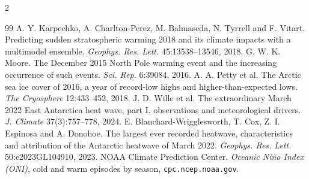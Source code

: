 \documentclass[10pt,twocolumn]{article}
\begin{document}
\begin{multicols}{2}
\begin{thebibliography}{99}
 A. Y. Karpechko, A. Charlton-Perez, M. Balmaseda, N. Tyrrell and F. Vitart. Predicting sudden stratospheric warming 2018 and its climate impacts with a multimodel ensemble. \emph{Geophys. Res. Lett.} 45:13538--13546, 2018.
 G. W. K. Moore. The December 2015 North Pole warming event and the increasing occurrence of such events. \emph{Sci. Rep.} 6:39084, 2016.
 A. A. Petty et al. The Arctic sea ice cover of 2016, a year of record-low highs and higher-than-expected lows. \emph{The Cryosphere} 12:433--452, 2018.
 J. D. Wille et al. The extraordinary March 2022 East Antarctica heat wave, part I, observations and meteorological drivers. \emph{J. Climate} 37(3):757--778, 2024.
 E. Blanchard-Wrigglesworth, T. Cox, Z. I. Espinosa and A. Donohoe. The largest ever recorded heatwave, characteristics and attribution of the Antarctic heatwave of March 2022. \emph{Geophys. Res. Lett.} 50:e2023GL104910, 2023.
 NOAA Climate Prediction Center. \emph{Oceanic Ni\~no Index (ONI)}, cold and warm episodes by season, \texttt{cpc.ncep.noaa.gov}.

\end{thebibliography}
\end{multicols}
\end{document}

